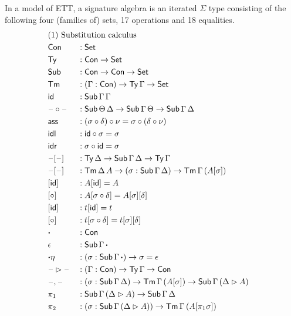 \documentclass[a4paper,UKenglish,cleveref, autoref]{lipics-v2019}
\begin{document}
\begin{definition}\label{def:algebra}
  In a model of ETT, a signature algebra is an iterated $\Sigma$ type
  consisting of the following four (families of) sets, 17 operations
  and 18 equalities.
\begin{alignat*}{5}
  & \rlap{(1) Substitution calculus} \\
  & \Con && : \Set \\
  & \Ty  && : \Con\ra\Set \\
  & \Sub  && : \Con\ra\Con\ra\Set \\
  & \Tm  && : (\Gamma:\Con)\ra\Ty\,\Gamma\ra\Set \\
  & \id && : \Sub\,\Gamma\,\Gamma \\
  & \blank\circ\blank && : \Sub\,\Theta\,\Delta\ra\Sub\,\Gamma\,\Theta\ra\Sub\,\Gamma\,\Delta \\
  & \ass && : (\sigma \circ \delta) \circ \nu = \sigma \circ (\delta \circ \nu) \\
  & \idl && : \id\circ\sigma = \sigma \\
  & \idr && : \sigma\circ\id = \sigma \\
  & \blank[\blank] && : \Ty\,\Delta\ra\Sub\,\Gamma\,\Delta\ra\Ty\,\Gamma \\
  & \blank[\blank] && : \Tm\,\Delta\,A\ra(\sigma:\Sub\,\Gamma\,\Delta)\ra\Tm\,\Gamma\,(A[\sigma]) \\
  & [\id] && : A[\id] = A \\
  & [\circ] && : A[\sigma \circ \delta] = A[\sigma][\delta] \\
  & [\id] && : t[\id] = t \\
  & [\circ] && : t[\sigma \circ \delta] = t[\sigma][\delta] \\
  & \boldsymbol{\cdot} && : \Con \\
  & \epsilon && : \Sub\,\Gamma\,\boldsymbol{\cdot} \\
  & {\boldsymbol{\cdot}\eta} && : (\sigma : \Sub\,\Gamma\,\boldsymbol{\cdot}) \ra \sigma = \epsilon \\
  & \blank\ext\blank && : (\Gamma:\Con)\ra\Ty\,\Gamma\ra\Con \\
  & \blank,\blank && : (\sigma:\Sub\,\Gamma\,\Delta)\ra\Tm\,\Gamma\,(A[\sigma])\ra\Sub\,\Gamma\,(\Delta\ext A) \\
  & \pi_1 && : \Sub\,\Gamma\,(\Delta\ext A)\ra \Sub\,\Gamma\,\Delta \\
  & \pi_2 && : (\sigma : \Sub\,\Gamma\,(\Delta\ext A))\ra \Tm\,\Gamma\,(A[\pi_1 \sigma]) \\

\end{alignat*}
\end{definition}
\end{document}
